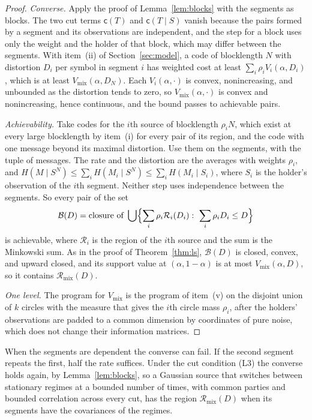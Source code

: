 \documentclass[11pt,onecolumn]{IEEEtran}
\begin{document}
\begin{proof}
\emph{Converse.} Apply the proof of Lemma~\ref{lem:blocks} with the
segments as blocks. The two cut terms $\mathsf c(T)$ and
$\mathsf c(T\mid S)$ vanish because the pairs formed by a segment and
its observations are independent, and the step for a block uses only
the weight and the holder of that block, which may differ between the
segments. With item~(ii) of Section~\ref{sec:model}, a code of
blocklength $N$ with distortion $D_i$ per symbol in segment $i$ has
weighted cost at least $\sum_i\rho_iV_i(\alpha,D_i)$, which is at least
$V_{\mathrm{mix}}(\alpha,D_N)$. Each $V_i(\alpha,\cdot)$ is convex, nonincreasing, and
unbounded as the distortion tends to zero, so
$V_{\mathrm{mix}}(\alpha,\cdot)$ is convex and nonincreasing, hence
continuous, and the bound passes to achievable pairs.

\emph{Achievability.} Take codes for the $i$th source of blocklength
$\rho_iN$, which exist at every large blocklength by item~(i) for
every pair of its region, and the code with one message beyond its
maximal distortion. Use them on the segments, with the tuple of
messages. The rate and the distortion are the averages with weights
$\rho_i$, and
$H(M\mid S^N)\le\sum_iH(M_i\mid S^N)\le\sum_iH(M_i\mid S_i)$, where $S_i$
is the holder's observation of the $i$th segment. Neither step uses
independence between the segments. So every pair of the set
\[
\mathcal B(D)=\text{closure of }\bigcup\Bigl\{\sum_i\rho_i\mathcal R_i(D_i):\ \sum_i\rho_iD_i\le D\Bigr\}
\]
is achievable, where $\mathcal R_i$ is the region of the $i$th source
and the sum is the Minkowski sum. As in the proof of
Theorem~\ref{thm:ls}, $\mathcal B(D)$ is closed, convex, and upward
closed, and its support value at $(\alpha,1-\alpha)$ is at most
$V_{\mathrm{mix}}(\alpha,D)$, so it contains
$\mathcal R_{\mathrm{mix}}(D)$.

\emph{One level.} The program for $V_{\mathrm{mix}}$ is the program of
item~(v) on the disjoint union of $k$ circles with the measure that
gives the $i$th circle mass $\rho_i$, after the holders' observations
are padded to a common dimension by coordinates of pure noise, which
does not change their information matrices.
\end{proof}

When the segments are dependent the converse can fail. If the second
segment repeats the first, half the rate suffices. Under the cut
condition (L3) the converse holds again, by Lemma~\ref{lem:blocks}, so
a Gaussian source that switches between stationary regimes at a
bounded number of times, with common parties and bounded correlation
across every cut, has the region $\mathcal R_{\mathrm{mix}}(D)$ when its
segments have the covariances of the regimes.
\end{document}
